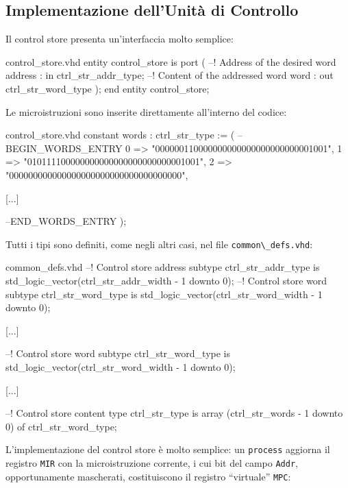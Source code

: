 \documentclass[a4paper,12pt]{scrreprt}
\begin{document}
\subsection{Implementazione dell'Unità di Controllo}

Il control store presenta un'interfaccia molto semplice:

\begin{myvhdl}{control\_store.vhd}
entity control_store is
  port (
    --! Address of the desired word
    address : in  ctrl_str_addr_type;
    --! Content of the addressed word
    word    : out ctrl_str_word_type
    );
end entity control_store;
\end{myvhdl}

Le microistruzioni sono inserite direttamente all'interno del codice:

\begin{myvhdl}{control\_store.vhd}
constant words : ctrl_str_type := (
--BEGIN_WORDS_ENTRY
0 => "000000110000000000000000000000001001",
1 => "010111100000000000000000000000001001",
2 => "000000000000000000000000000000000000",

[...]

--END_WORDS_ENTRY
);
\end{myvhdl}

Tutti i tipi sono definiti, come negli altri casi, nel file
\lstinline{common\_defs.vhd}:

\begin{myvhdl}{common\_defs.vhd}
--! Control store address
subtype ctrl_str_addr_type is std_logic_vector(ctrl_str_addr_width - 1 downto 0);
--! Control store word
subtype ctrl_str_word_type is std_logic_vector(ctrl_str_word_width - 1 downto 0);

[...]

--! Control store word
subtype ctrl_str_word_type is std_logic_vector(ctrl_str_word_width - 1 downto 0);

[...]

--! Control store content
type ctrl_str_type is array (ctrl_str_words - 1 downto 0) of ctrl_str_word_type;
\end{myvhdl}

L'implementazione del control store è molto semplice: un \lstinline{process}
aggiorna il registro \lstinline{MIR} con la microistruzione corrente, i cui bit
del campo \lstinline{Addr}, opportunamente mascherati, costituiscono il registro
``virtuale'' \lstinline{MPC}:
\end{document}
